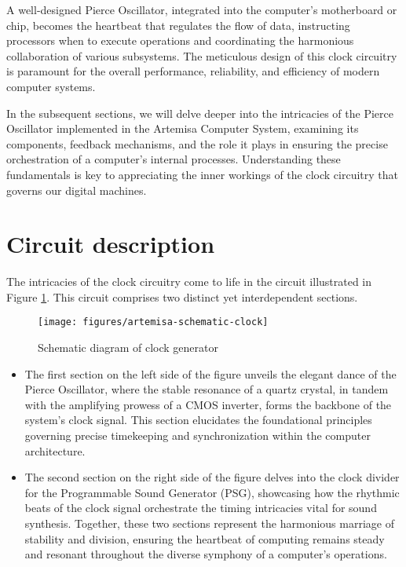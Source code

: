 A well-designed Pierce Oscillator, integrated into the computer's motherboard or chip, becomes the heartbeat that regulates the flow of data, instructing processors when to execute operations and coordinating the harmonious collaboration of various subsystems. The meticulous design of this clock circuitry is paramount for the overall performance, reliability, and efficiency of modern computer systems.

In the subsequent sections, we will delve deeper into the intricacies of the Pierce Oscillator implemented in the Artemisa Computer System, examining its components, feedback mechanisms, and the role it plays in ensuring the precise orchestration of a computer's internal processes. Understanding these fundamentals is key to appreciating the inner workings of the clock circuitry that governs our digital machines.

\section{Circuit description}

The intricacies of the clock circuitry come to life in the circuit illustrated in Figure \ref{fig:artemisa-schematic-clock}. This circuit comprises two distinct yet interdependent sections. 

\begin{figure}[h]
  \centering
  \texttt{[image: figures/artemisa-schematic-clock]}
  \caption{Schematic diagram of clock generator}
  \label{fig:artemisa-schematic-clock}
\end{figure}

\begin{itemize}
  \item The first section on the left side of the figure unveils the elegant dance of the Pierce Oscillator, where the stable resonance of a quartz crystal, in tandem with the amplifying prowess of a CMOS inverter, forms the backbone of the system's clock signal. This section elucidates the foundational principles governing precise timekeeping and synchronization within the computer architecture. 
  \item The second section on the right side of the figure delves into the clock divider for the Programmable Sound Generator (PSG), showcasing how the rhythmic beats of the clock signal orchestrate the timing intricacies vital for sound synthesis. Together, these two sections represent the harmonious marriage of stability and division, ensuring the heartbeat of computing remains steady and resonant throughout the diverse symphony of a computer's operations.
\end{itemize}
  
